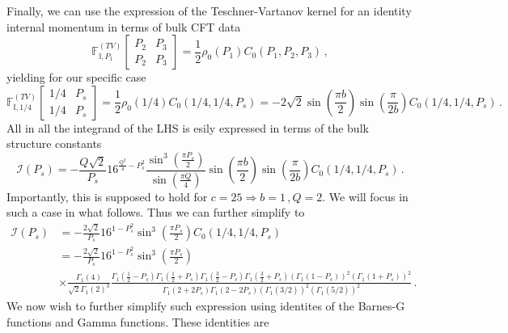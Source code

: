\documentclass[11pt]{article}
\begin{document}
Finally, we can use the expression of the Teschner-Vartanov kernel for an identity internal momentum in terms of bulk CFT data
\begin{equation}\label{eq:identityintermsofCFTdata}
    \mathbb{F}^{(TV)}_{\mathbb{I}, P_1} 
    \begin{bmatrix}
     P_2 & P_3 \\
     P_2 & P_3 \end{bmatrix} = \frac{1}{2}\rho_0(P_1)C_0(P_1,P_2,P_3)\,,
\end{equation}
yielding for our specific case
\begin{equation}
    \mathbb{F}^{(TV)}_{\mathbb{I}, 1/4} 
    \begin{bmatrix}
     1/4 & P_s \\
     1/4 & P_s \end{bmatrix} = \frac{1}{2}\rho_0(1/4)C_0(1/4,1/4,P_s) = -2\sqrt{2}\sin\left(\frac{\pi b}{2}\right)\sin\left(\frac{\pi}{2b}\right)C_0(1/4,1/4,P_s)\,.
\end{equation}
All in all the integrand of the LHS is esily expressed in terms of the bulk structure constants
\begin{equation}
    \mathcal{I}(P_s) = -\frac{Q\sqrt{2}}{P_s}16^{\frac{Q^2}{4}-P_s^2}\frac{\sin^3\left(\frac{\pi P_s}{2}\right)}{\sin\left(\frac{\pi Q}{4}\right)}\sin\left(\frac{\pi b}{2}\right)\sin\left(\frac{\pi}{2b}\right)C_0(1/4,1/4,P_s)\,.
\end{equation}
Importantly, this is supposed to hold for $c=25\Rightarrow b=1\,,Q=2$. We will focus in such a case in what follows. Thus we can further simplify to
\begin{equation}\label{eq:finalTVintegrand}
\begin{aligned}
    \mathcal{I}(P_s) &= -\frac{2\sqrt{2}}{P_s}16^{1-P_s^2}\sin^3\left(\frac{\pi P_s}{2}\right)C_0(1/4,1/4,P_s)\\
    &= -\frac{2\sqrt{2}}{P_s}16^{1-P_s^2}\sin^3\left(\frac{\pi P_s}{2}\right)\\
    &\times \frac{\Gamma_1(4)}{\sqrt{2}\Gamma_1(2)^3}\frac{\Gamma_1\left(\frac{1}{2}-P_s\right)\Gamma_1\left(\frac{1}{2}+P_s\right)\Gamma_1\left(\frac{3}{2}-P_s\right)\Gamma_1\left(\frac{3}{2}+P_s\right)\left(\Gamma_1\left(1-P_s\right)\right)^2\left(\Gamma_1\left(1+P_s\right)\right)^2}{\Gamma_1\left(2+2P_s\right)\Gamma_1\left(2-2P_s\right)\left(\Gamma_1\left(3/2\right)\right)^2 \left(\Gamma_1\left(5/2\right)\right)^2}\,.
\end{aligned}
\end{equation}
We now wish to further simplify such expression using identites of the Barnes-G functions and Gamma functions. These identities are
\end{document}
